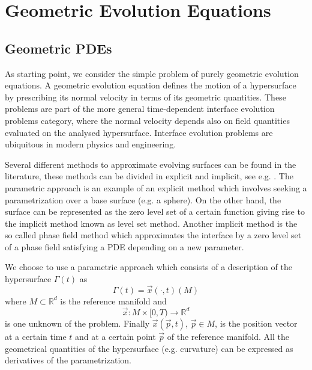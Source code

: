 \chapter{\sc Geometric Evolution Equations}
\label{ch:1}

\section[Geometric PDEs]{Geometric PDEs}
As starting point, we consider the simple problem of purely geometric evolution 
equations. A geometric evolution equation defines the motion of a hypersurface 
by prescribing its normal velocity in terms of its geometric quantities. These 
problems are part of the more general time-dependent interface evolution 
problems category, where the normal velocity depends also on field quantities
evaluated on the analysed hypersurface. Interface evolution problems are 
ubiquitous in modern physics and engineering.

Several different methods to approximate evolving surfaces can be found in the
literature, these methods can be divided in explicit and implicit, see e.g.
\cite{DeckelnickDE05}. The parametric approach is an example of an explicit
method which involves seeking a parametrization over a base surface (e.g. a
sphere). On the other hand, the surface can be represented as the zero level set
of a certain function giving rise to the implicit method known as level set
method. Another implicit method is the so called phase field method which
approximates the interface by a zero level set of a phase field satisfying a PDE
depending on a new parameter.
\newline

We choose to use a parametric approach which consists of a description
of the hypersurface $\Gamma(t)$ as
\begin{equation}\label{eq:parametric_hypersurface}
 \Gamma(t)=\vec{x}(\cdot,t)(M)
\end{equation}
where $M\subset\mathbb{R}^{d}$ is the reference manifold and
\begin{equation}\label{eq:position_vector}
 \vec{x}:M\times[0,T)\rightarrow\mathbb{R}^{d}
\end{equation}
is one unknown of the problem. Finally $\vec{x}(\vec{p},t)$, $\vec{p}\in M$, is
the position vector at a certain time $t$ and at a certain point $\vec{p}$ of
the reference manifold. All the geometrical quantities of the hypersurface (e.g.
curvature) can be expressed as derivatives of the parametrization.
\newline

